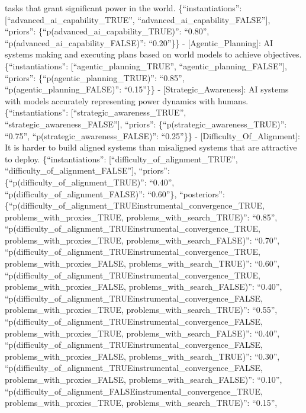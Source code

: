 \documentclass[
  11pt,
  letterpaper,
]{book}
\begin{document}
tasks that grant significant power in the world. \{``instantiations'':
{[}``advanced\_ai\_capability\_TRUE'',
``advanced\_ai\_capability\_FALSE''{]}, ``priors'':
\{``p(advanced\_ai\_capability\_TRUE)'': ``0.80'',
``p(advanced\_ai\_capability\_FALSE)'': ``0.20''\}\} -
{[}Agentic\_Planning{]}: AI systems making and executing plans based on
world models to achieve objectives. \{``instantiations'':
{[}``agentic\_planning\_TRUE'', ``agentic\_planning\_FALSE''{]},
``priors'': \{``p(agentic\_planning\_TRUE)'': ``0.85'',
``p(agentic\_planning\_FALSE)'': ``0.15''\}\} -
{[}Strategic\_Awareness{]}: AI systems with models accurately
representing power dynamics with humans. \{``instantiations'':
{[}``strategic\_awareness\_TRUE'', ``strategic\_awareness\_FALSE''{]},
``priors'': \{``p(strategic\_awareness\_TRUE)'': ``0.75'',
``p(strategic\_awareness\_FALSE)'': ``0.25''\}\} -
{[}Difficulty\_Of\_Alignment{]}: It is harder to build aligned systems
than misaligned systems that are attractive to deploy.
\{``instantiations'': {[}``difficulty\_of\_alignment\_TRUE'',
``difficulty\_of\_alignment\_FALSE''{]}, ``priors'':
\{``p(difficulty\_of\_alignment\_TRUE)'': ``0.40'',
``p(difficulty\_of\_alignment\_FALSE)'': ``0.60''\}, ``posteriors'':
\{``p(difficulty\_of\_alignment\_TRUE\textbar instrumental\_convergence\_TRUE,
problems\_with\_proxies\_TRUE, problems\_with\_search\_TRUE)'':
``0.85'',
``p(difficulty\_of\_alignment\_TRUE\textbar instrumental\_convergence\_TRUE,
problems\_with\_proxies\_TRUE, problems\_with\_search\_FALSE)'':
``0.70'',
``p(difficulty\_of\_alignment\_TRUE\textbar instrumental\_convergence\_TRUE,
problems\_with\_proxies\_FALSE, problems\_with\_search\_TRUE)'':
``0.60'',
``p(difficulty\_of\_alignment\_TRUE\textbar instrumental\_convergence\_TRUE,
problems\_with\_proxies\_FALSE, problems\_with\_search\_FALSE)'':
``0.40'',
``p(difficulty\_of\_alignment\_TRUE\textbar instrumental\_convergence\_FALSE,
problems\_with\_proxies\_TRUE, problems\_with\_search\_TRUE)'':
``0.55'',
``p(difficulty\_of\_alignment\_TRUE\textbar instrumental\_convergence\_FALSE,
problems\_with\_proxies\_TRUE, problems\_with\_search\_FALSE)'':
``0.40'',
``p(difficulty\_of\_alignment\_TRUE\textbar instrumental\_convergence\_FALSE,
problems\_with\_proxies\_FALSE, problems\_with\_search\_TRUE)'':
``0.30'',
``p(difficulty\_of\_alignment\_TRUE\textbar instrumental\_convergence\_FALSE,
problems\_with\_proxies\_FALSE, problems\_with\_search\_FALSE)'':
``0.10'',
``p(difficulty\_of\_alignment\_FALSE\textbar instrumental\_convergence\_TRUE,
problems\_with\_proxies\_TRUE, problems\_with\_search\_TRUE)'':
``0.15'',
\end{document}
